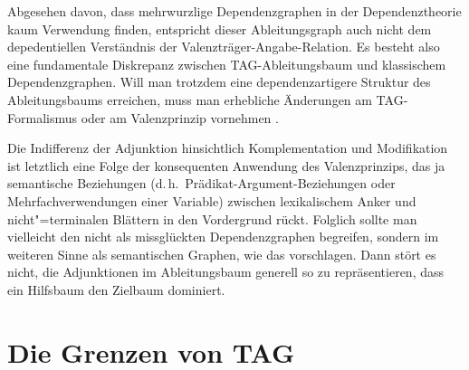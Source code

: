 Abgesehen davon, dass mehrwurzlige Dependenzgraphen in der Dependenztheorie kaum Verwendung finden, entspricht dieser Ableitungsgraph auch nicht dem depedentiellen Verständnis der Valenzträger-Angabe-Relation. Es besteht also eine fundamentale Diskrepanz zwischen TAG-Ableitungsbaum und klassischem Dependenzgraphen. Will man trotzdem eine dependenzartigere Struktur des Ableitungsbaums erreichen, muss man erhebliche Änderungen am TAG-Formalismus oder am Valenzprinzip vornehmen \citep{Rambow:etal:95,Schabes:Shieber:94}.            

Die Indifferenz der Adjunktion hinsichtlich Komplementation und Modifikation ist letztlich eine Folge der konsequenten Anwendung des Valenzprinzips, das ja semantische Beziehungen (d.\,h.\ Prädikat-Argument-Beziehungen oder Mehrfachverwendungen einer Variable) zwischen lexikalischem Anker und nicht"=terminalen Blättern in den Vordergrund rückt. Folglich sollte man vielleicht den  nicht als missglückten Dependenzgraphen begreifen, sondern  im weiteren Sinne als semantischen Graphen, wie das \cite{Candito:Kahane:98} vorschlagen. Dann stört es nicht, die Adjunktionen im Ableitungsbaum generell so zu repräsentieren, dass ein Hilfsbaum den Zielbaum dominiert.


\section{Die Grenzen von TAG} \label{sec-tag-grenzen}

